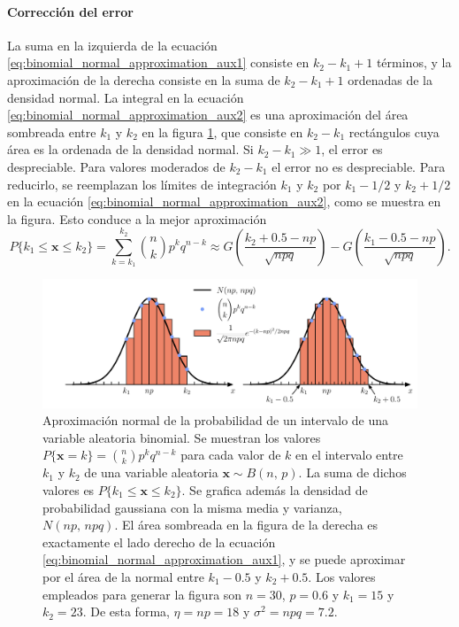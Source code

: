 \documentclass[a4paper]{report}
\newcommand{\x}{\mathbf{x}}
\begin{document}
\paragraph{Corrección del error} La suma en la izquierda de la ecuación \ref{eq:binomial_normal_approximation_aux1} consiste en \(k_2-k_1+1\) términos, y la aproximación de la derecha consiste en la suma de \(k_2-k_1+1\) ordenadas de la densidad normal. La integral en la ecuación \ref{eq:binomial_normal_approximation_aux2} es una aproximación del área sombreada entre \(k_1\) y \(k_2\) en la figura \ref{fig:binomial_normal_approximation}, que consiste en \(k_2-k_1\) rectángulos cuya área es la ordenada de la densidad normal. Si \(k_2-k_1\gg1\), el error es despreciable. Para valores moderados de \(k_2-k_1\) el error no es despreciable. Para reducirlo, se reemplazan los límites de integración \(k_1\) y \(k_2\) por \(k_1-1/2\) y \(k_2+1/2\) en la ecuación \ref{eq:binomial_normal_approximation_aux2}, como se muestra en la figura. Esto conduce a la mejor aproximación
\begin{equation}\label{eq:binomial_normal_approximation_correction}
 P\{k_1\leq\x\leq k_2\}=\sum_{k=k_1}^{k_2}\binom{n}{k}p^kq^{n-k}\approx G\left(\frac{k_2+0.5-np}{\sqrt{npq}}\right)-G\left(\frac{k_1-0.5-np}{\sqrt{npq}}\right).
\end{equation}
\begin{figure}[!htb]
\begin{center}
\includegraphics[width=1\columnwidth]{figuras/binomial_normal_approximation.pdf}
\caption{\label{fig:binomial_normal_approximation} Aproximación normal de la probabilidad de un intervalo de una variable aleatoria binomial. Se muestran los valores \(P\{\x=k\}=\binom{n}{k}p^kq^{n-k}\) para cada valor de \(k\) en el intervalo entre \(k_1\) y \(k_2\) de una variable aleatoria \(\x\sim B(n,\,p)\). La suma de dichos valores es \(P\{k_1\leq\x\leq k_2\}\). Se grafica además la densidad de probabilidad gaussiana con la misma media y varianza, \(N(np,\,npq)\). El área sombreada en la figura de la derecha es exactamente el lado derecho de la ecuación \ref{eq:binomial_normal_approximation_aux1}, y se puede aproximar por el área de la normal entre \(k_1-0.5\) y \(k_2+0.5\). Los valores empleados para generar la figura son \(n=30\), \(p=0.6\) y \(k_1=15\) y \(k_2=23\). De esta forma, \(\eta=np=18\) y \(\sigma^2=npq=7.2\).}
\end{center}
\end{figure}
\end{document}
